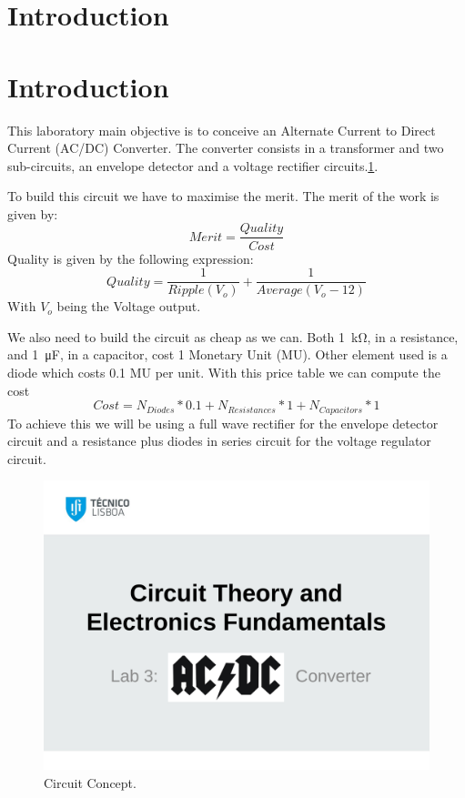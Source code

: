 \section{Introduction}

\section{Introduction}

This laboratory main objective is to conceive an Alternate Current to Direct Current (AC/DC) Converter. The converter consists in a transformer and two sub-circuits, an envelope detector and a voltage rectifier circuits.\ref{Fig1: circuit}.

To build this circuit we have to maximise the merit. The merit of the work is given by:
\begin{equation}
    Merit = \dfrac{Quality}{Cost}
\end{equation}
Quality is given by the following expression:
\begin{equation}
    Quality = \dfrac{1}{Ripple(V_o)} + \dfrac{1}{Average(V_o-12)} 
\end{equation}
With $V_o$ being the Voltage output.

We also need to build the circuit as cheap as we can. Both \SI{1}{\kilo\ohm}, in a resistance, and \SI{1}{\micro\farad}, in a capacitor, cost 1 Monetary Unit (MU). Other element used is a diode which costs 0.1 MU per unit.
With this price table we can compute the cost
\begin{equation}
    Cost = N_{Diodes}*0.1+N_{Resistances}*1+N_{Capacitors}*1
\end{equation}
To achieve this we will be using a full wave rectifier for the envelope detector circuit and a resistance plus diodes in series circuit for the voltage regulator circuit.

\begin{figure}[h] 
\centering
\includegraphics[width=0.6\linewidth]{t3.pdf}
\caption{Circuit Concept.}
\label{Fig1: circuit}
\end{figure}
